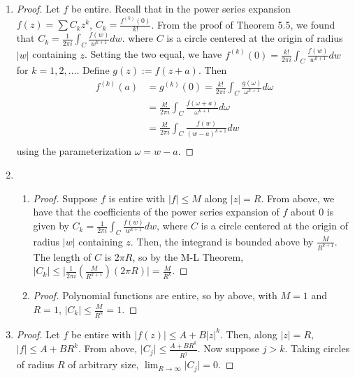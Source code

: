 \documentclass[11pt, letterpaper]{article}
\begin{document}
\begin{enumerate}
  \item \begin{proof}
    Let $f$ be entire. Recall that in the power series expansion $f(z) = \sum C_k z^k$, $C_k = \frac{f^{(k)}(0)}{k!}$. From the proof of Theorem 5.5, we found that $C_k = \frac{1}{2\pi i} \int_C \frac{f(w)}{w^{k + 1}} dw$. where $C$ is a circle centered at the origin of radius $\vert w \vert$ containing $z$. Setting the two equal, we have $f^{(k)}(0) = \frac{k!}{2\pi i} \int_C \frac{f(w)}{w^{k + 1}} dw$ for $k = 1, 2, \dots$. Define $g(z) := f(z + a)$. Then 
    \begin{align*}
      f^{(k)}(a) &= g^{(k)}(0) = \frac{k!}{2\pi i} \int_C \frac{g(\omega)}{\omega^{k + 1}} d\omega \\
      &= \frac{k!}{2\pi i} \int_C \frac{f(\omega + a)}{\omega^{k + 1}} d\omega \\
      &= \frac{k!}{2\pi i} \int_C \frac{f(w)}{(w - a)^{k + 1}} dw \\
    \end{align*}
    using the parameterization $\omega = w - a$.
  \end{proof}

  \item \begin{enumerate}
    \item \begin{proof}
      Suppose $f$ is entire with $\vert f \vert \leq M$ along $\vert z \vert = R$. From above, we have that the coefficients of the power series expansion of $f$ about 0 is given by $C_k = \frac{1}{2 \pi i} \int_C \frac{f(w)}{w^{k + 1}} dw$, where $C$ is a circle centered at the origin of radius $\vert w \vert$ containing $z$. Then, the integrand is bounded above by $\frac{M}{R^{k + 1}}$. The length of $C$ is $2\pi R$, so by the M-L Theorem, $\vert C_k \vert \leq \vert \frac{1}{2\pi i} \left(\frac{M}{R^{k + 1}}\right)(2 \pi R) \vert = \frac{M}{R^k}$.
    \end{proof}

    \item \begin{proof}
      Polynomial functions are entire, so by above, with $M = 1$ and $R = 1$, $\vert C_k \vert \leq \frac{M}{R^k} = 1$.
    \end{proof}
  \end{enumerate}

  \item \begin{proof}
    Let $f$ be entire with $\vert f(z) \vert \leq A + B \vert z \vert^k$. Then, along $\vert z \vert = R$, $\vert f \vert \leq A + BR^k$. From above, $\vert C_j \vert \leq \frac{A + BR^k}{R^j}$. Now suppose $j > k$. Taking circles of radius $R$ of arbitrary size, $\lim_{R \to \infty} \vert C_j \vert = 0$.
  \end{proof}


\end{enumerate}
\end{document}
